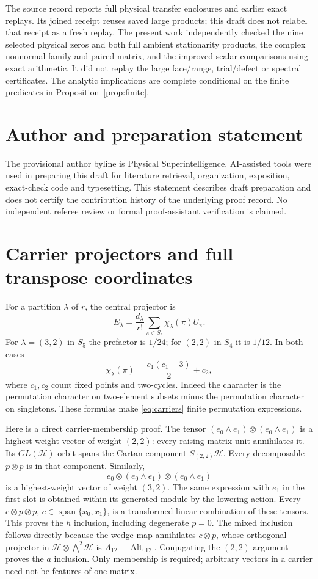 \documentclass[11pt,a4paper]{article}
\theoremstyle{definition}\newtheorem{definition}[theorem]{Definition}
\theoremstyle{remark}\newtheorem{remark}[theorem]{Remark}
\DeclareMathOperator{\Alt}{Alt}\DeclareMathOperator{\diag}{diag}
\newcommand{\HH}{\mathcal H}\newcommand{\LL}{\mathcal L}
\numberwithin{equation}{section}
\begin{document}
The source record reports full physical transfer enclosures and
earlier exact replays. Its joined receipt reuses saved large products;
this draft does not relabel that receipt as a fresh replay.
The present work independently checked the nine selected physical
zeros and both full ambient stationarity products, the complex
nonnormal family and paired matrix, and the improved scalar comparisons
using exact arithmetic. It did not replay the large face/range,
trial/defect or spectral certificates.
The analytic implications are complete conditional on the finite
predicates in Proposition~\ref{prop:finite}.

\section*{Author and preparation statement}
The provisional author byline is Physical Superintelligence.
AI-assisted tools were used in preparing this draft for literature
retrieval, organization, exposition, exact-check code and typesetting.
This statement describes draft preparation and does not certify the
contribution history of the underlying proof record.
No independent referee review or formal proof-assistant verification
is claimed.

\appendix
\section{Carrier projectors and full transpose coordinates}\label{app:carrierproof}
For a partition $\lambda$ of $r$, the central projector is
\[
E_\lambda=\frac{d_\lambda}{r!}
 \sum_{\pi\in S_r}\chi_\lambda(\pi)U_\pi.
\]
For $\lambda=(3,2)$ in $S_5$ the prefactor is $1/24$;
for $(2,2)$ in $S_4$ it is $1/12$.
In both cases
\[
\chi_\lambda(\pi)=\frac{c_1(c_1-3)}2+c_2,
\]
where $c_1,c_2$ count fixed points and two-cycles.
Indeed the character is the permutation character on two-element
subsets minus the permutation character on singletons.
These formulas make \eqref{eq:carriers} finite permutation expressions.

Here is a direct carrier-membership proof.
The tensor
$(e_0\wedge e_1)\otimes(e_0\wedge e_1)$ is a highest-weight vector
of weight $(2,2)$: every raising matrix unit annihilates it.
Its $GL(\HH)$ orbit spans the Cartan component $S_{(2,2)}\HH$.
Every decomposable $p\otimes p$ is in that component.
Similarly,
\[
e_0\otimes(e_0\wedge e_1)\otimes(e_0\wedge e_1)
\]
is a highest-weight vector of weight $(3,2)$.
The same expression with $e_1$ in the first slot is obtained within
its generated module by the lowering action. Every
$c\otimes p\otimes p$, $c\in\operatorname{span}\{x_0,x_1\}$,
is a transformed linear combination of these tensors.
This proves the $h$ inclusion, including degenerate $p=0$.
The mixed inclusion follows directly because the wedge map annihilates
$c\otimes p$, whose orthogonal projector in
$\HH\otimes\bigwedge^2\HH$ is $A_{12}-\Alt_{012}$.
Conjugating the $(2,2)$ argument proves the $a$ inclusion.
Only membership is required; arbitrary vectors in a carrier need
not be features of one matrix.
\end{document}
